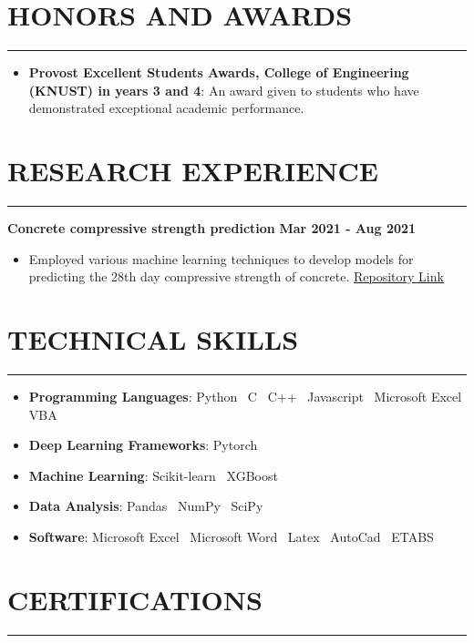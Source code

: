 \documentclass[letterpaper, 11pt]{article}
\newcommand{\cvsection}[1]{
	\section*{#1} \vspace*{-0.8cm}%
	\rule{\linewidth}{1.5pt}\par
}
\begin{document}

\cvsection{HONORS AND AWARDS}

\begin{itemize}[leftmargin=*]

	\item \textbf{Provost Excellent Students Awards, College of Engineering (KNUST) in
     years 3 and 4}: An award given to students who have demonstrated exceptional
     academic performance.

\end{itemize}


\cvsection{RESEARCH EXPERIENCE}

\textbf{Concrete compressive strength prediction} \hfill \space
\textbf{Mar 2021 - Aug 2021}

\begin{itemize}[leftmargin=*]

	\item Employed various machine learning techniques to develop models for predicting
    the 28th day compressive strength of concrete.
	\href{https://www.github.com/patrickboateng/compressive-strength-prediction}
    {Repository Link}

\end{itemize}


\cvsection{TECHNICAL SKILLS}

\begin{itemize}[leftmargin=*]

	\item \textbf{Programming Languages}: Python \vrule \, C \vrule \, C++ \vrule \,
    Javascript \vrule \, Microsoft Excel VBA
	\item \textbf{Deep Learning Frameworks}: Pytorch
	\item \textbf{Machine Learning}: Scikit-learn \vrule \, XGBoost
	\item \textbf{Data Analysis}: Pandas \vrule \, NumPy \vrule \, SciPy
	\item \textbf{Software}: Microsoft Excel \vrule \, Microsoft Word \vrule \, Latex
    \vrule \, AutoCad \vrule \, ETABS

\end{itemize}


\cvsection{CERTIFICATIONS}
\end{document}
